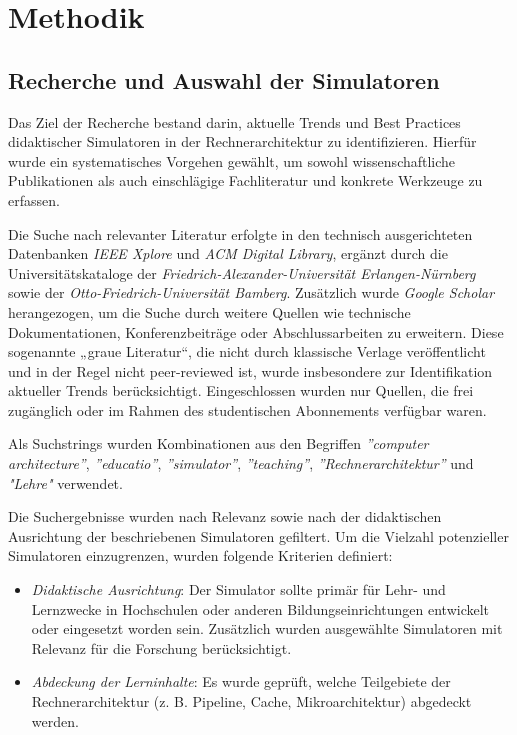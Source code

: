 \chapter{Methodik}

\section{Recherche und Auswahl der Simulatoren}

Das Ziel der Recherche bestand darin, aktuelle Trends und Best Practices didaktischer Simulatoren in der Rechnerarchitektur zu identifizieren. Hierfür wurde ein systematisches Vorgehen gewählt, um sowohl wissenschaftliche Publikationen als auch einschlägige Fachliteratur und konkrete Werkzeuge zu erfassen.

Die Suche nach relevanter Literatur erfolgte in den technisch ausgerichteten Datenbanken \textit{IEEE Xplore} und \textit{ACM Digital Library}, ergänzt durch die Universitätskataloge der \textit{Friedrich-Alexander-Universität Erlangen-Nürnberg} sowie der \textit{Otto-Friedrich-Universität Bamberg}. Zusätzlich wurde \textit{Google Scholar} herangezogen, um die Suche durch weitere Quellen wie technische Dokumentationen, Konferenzbeiträge oder Abschlussarbeiten zu erweitern. Diese sogenannte „graue Literatur“, die nicht durch klassische Verlage veröffentlicht und in der Regel nicht peer-reviewed ist, wurde insbesondere zur Identifikation aktueller Trends berücksichtigt. Eingeschlossen wurden nur Quellen, die frei zugänglich oder im Rahmen des studentischen Abonnements verfügbar waren.

Als Suchstrings wurden Kombinationen aus den Begriffen \textit{''computer architecture''}, \textit{''educatio''}, \textit{''simulator''}, \textit{''teaching''}, \textit{''Rechnerarchitektur''} und \textit{"Lehre"} verwendet.

Die Suchergebnisse wurden nach Relevanz sowie nach der didaktischen Ausrichtung der beschriebenen Simulatoren gefiltert. Um die Vielzahl potenzieller Simulatoren einzugrenzen, wurden folgende Kriterien definiert:

\begin{itemize}
  \item \textit{Didaktische Ausrichtung}: Der Simulator sollte primär für Lehr- und Lernzwecke in Hochschulen oder anderen Bildungseinrichtungen entwickelt oder eingesetzt worden sein. Zusätzlich wurden ausgewählte Simulatoren mit Relevanz für die Forschung berücksichtigt.
  \item \textit{Abdeckung der Lerninhalte}: Es wurde geprüft, welche Teilgebiete der Rechnerarchitektur (z. B. Pipeline, Cache, Mikroarchitektur) abgedeckt werden.
\end{itemize}

